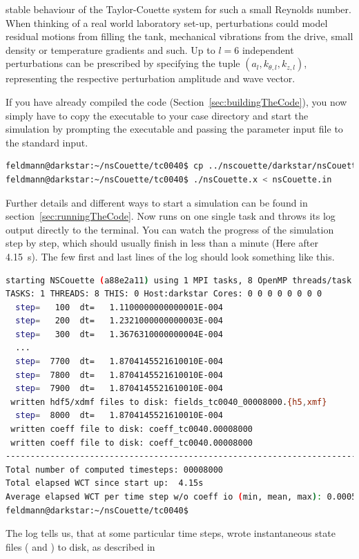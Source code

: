 \documentclass[a4paper, 11pt, DIV=11]{scrartcl}
\begin{document}
stable behaviour of the Taylor-Couette system for such a small Reynolds number.
When thinking of a real world laboratory set-up, perturbations could model residual
motions from filling the tank, mechanical vibrations from the drive, small density
or temperature gradients and such. Up to $l=6$ independent perturbations can be
prescribed by specifying the tuple $(a_l, k_{\theta,l}, k_{z,l})$, representing
the respective perturbation amplitude and wave vector. \par If you have already
compiled the code (Section~\ref{sec:buildingTheCode}), you now simply have to copy
the executable to your case directory and start the simulation by prompting the
executable and passing the parameter input file to the standard input.
\begin{lstlisting}[language=bash]
feldmann@darkstar:~/nsCouette/tc0040$ cp ../nscouette/darkstar/nsCouette.x .
feldmann@darkstar:~/nsCouette/tc0040$ ./nsCouette.x < nsCouette.in
\end{lstlisting}
Further details and different ways to start a simulation can be found in
section~\ref{sec:runningTheCode}. Now \nsc runs on one single \mpi task and
throws its log output directly to the terminal. You can watch the progress
of the simulation step by step, which should usually finish in less than a
minute (Here after \SI{4.15}{\second}). The few first and last lines of the
log should look something like this.
\begin{lstlisting}[language=bash]
starting NSCouette (a88e2a11) using 1 MPI tasks, 8 OpenMP threads/task
TASKS: 1 THREADS: 8 THIS: 0 Host:darkstar Cores: 0 0 0 0 0 0 0 0
  step=   100  dt=   1.1100000000000001E-004
  step=   200  dt=   1.2321000000000003E-004
  step=   300  dt=   1.3676310000000004E-004
  ...
  step=  7700  dt=   1.8704145521610010E-004
  step=  7800  dt=   1.8704145521610010E-004
  step=  7900  dt=   1.8704145521610010E-004
 written hdf5/xdmf files to disk: fields_tc0040_00008000.{h5,xmf}
  step=  8000  dt=   1.8704145521610010E-004
 written coeff file to disk: coeff_tc0040.00008000       
 written coeff file to disk: coeff_tc0040.00008000       
------------------------------------------------------------------------------------
Total number of computed timesteps: 00008000
Total elapsed WCT since start up:  4.15s
Average elapsed WCT per time step w/o coeff io (min, mean, max): 0.0005s, 0.0005s, 0.0005s
feldmann@darkstar:~/nsCouette/tc0040$
\end{lstlisting}
The log tells us, that at some particular time steps, \nsc wrote instantaneous
state files ( and ) to disk, as described in 
\end{document}
